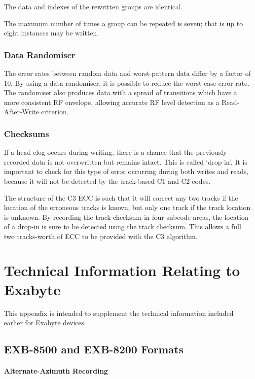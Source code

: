 The data and indexes of the rewritten groups are identical.

The maximum number of times a group can be repeated is seven; that is up to
eight instances may be written.

\subsubsection {Data Randomiser}

The error rates between random data and worst-pattern data differ by a
factor of 10. By using a data randomiser, it is possible to reduce the
worst-case error rate. The randomiser also produces data with a spread of
transitions which have a more consistent RF envelope, allowing accurate RF
level detection as a Read-After-Write criterion.

\subsubsection {Checksums}

If a head clog occurs during writing, there is a chance that the previously
recorded data is not overwritten but remains intact. This is called
`drop-in'. It is important to check for this type of error occurring during
both writes and reads, because it will not be detected by the track-based C1
and C2 codes.

The structure of the C3 ECC is such that it will correct any two tracks if
the location of the erroneous tracks is known, but only one track if the
track location is unknown. By recording the track checksum in four subcode
areas, the location of a drop-in is sure to be detected using the track
checksum. This allows a full two tracks-worth of ECC to be provided with the
C3 algorithm.

\pagebreak

\section {Technical Information Relating to Exabyte}

This appendix is intended to supplement the technical information included
earlier for Exabyte devices.

\subsection {EXB-8500 and EXB-8200 Formats}

\paragraph {Alternate-Azimuth Recording}

